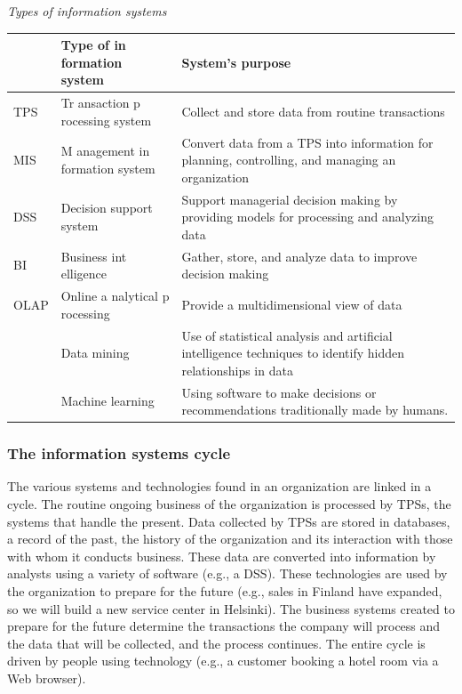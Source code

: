 \documentclass[
]{article}
\begin{document}
\emph{Types of information systems}

\begin{longtable}[]{@{}
  >{\raggedright\arraybackslash}p{}
  >{\raggedright\arraybackslash}p{}
  >{\raggedright\arraybackslash}p{}@{}}
\toprule
& Type of in formation system & System's purpose \\
\midrule
\endhead
TPS & Tr ansaction p rocessing system & Collect and store data from routine transactions \\
MIS & M anagement in formation system & Convert data from a TPS into information for planning, controlling, and managing an organization \\
DSS & Decision support system & Support managerial decision making by providing models for processing and analyzing data \\
BI & Business int elligence & Gather, store, and analyze data to improve decision making \\
OLAP & Online a nalytical p rocessing & Provide a multidimensional view of data \\
& Data mining & Use of statistical analysis and artificial intelligence techniques to identify hidden relationships in data \\
& Machine learning & Using software to make decisions or recommendations traditionally made by humans. \\
\bottomrule
\end{longtable}

\hypertarget{the-information-systems-cycle}{%
\subsubsection*{The information systems cycle}\label{the-information-systems-cycle}}

The various systems and technologies found in an organization are linked
in a cycle. The routine ongoing business of the organization is
processed by TPSs, the systems that handle the present. Data collected
by TPSs are stored in databases, a record of the past, the history of
the organization and its interaction with those with whom it conducts
business. These data are converted into information by analysts using a
variety of software (e.g., a DSS). These technologies are used by the
organization to prepare for the future (e.g., sales in Finland have
expanded, so we will build a new service center in Helsinki). The
business systems created to prepare for the future determine the
transactions the company will process and the data that will be
collected, and the process continues. The entire cycle is driven by
people using technology (e.g., a customer booking a hotel room via a Web
browser).
\end{document}
